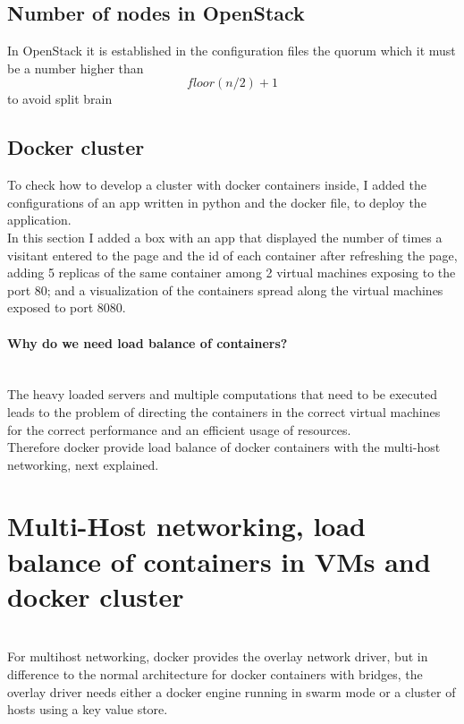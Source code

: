 \subsection{Number of nodes in OpenStack}
In OpenStack it is established in the configuration files the quorum which it must be a number higher than \begin{equation}
floor(n/2) + 1 
\end{equation} to avoid split brain\cite{10}

\subsection{Docker cluster}

To check how to develop a cluster with docker containers inside, I added the configurations of an app written in python and the docker file, to deploy the application.\\

In this section I added a box with an app that displayed the number of times a visitant entered to the page and the id of each container after refreshing the page, adding 5 replicas of the same container among 2 virtual machines exposing to the port 80; and a visualization of the containers spread along the virtual machines exposed to port 8080.

\paragraph{Why do we need load balance of containers?}\\

The heavy loaded servers and multiple computations that need to be executed leads to the problem of directing the containers in the correct virtual machines for the correct performance and an efficient usage of resources.\\

Therefore docker provide load balance of docker containers with the multi-host networking, next explained.\\

\section{Multi-Host networking, load balance of containers in VMs and docker cluster}\\

For multihost networking, docker provides the overlay network driver, but in difference to the normal architecture for docker containers with bridges, the overlay driver needs either a docker engine running in swarm mode or a cluster of hosts using a key value store. \\

